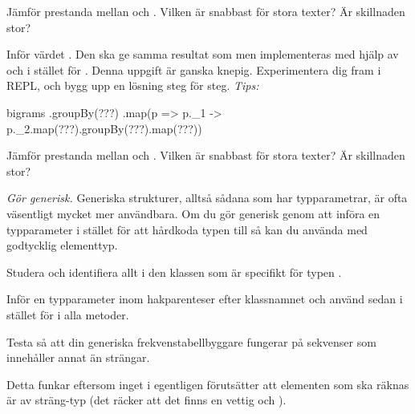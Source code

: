 \Subtask\Uberkurs Jämför prestanda mellan  och . Vilken är snabbast för stora texter? Är skillnaden stor?

\Subtask Inför värdet . Den ska ge samma resultat som  men implementeras med hjälp av  och  i stället för .
Denna uppgift är ganska knepig. Experimentera dig fram i REPL, och bygg upp en lösning steg för steg. \emph{Tips:}
\begin{Code}
bigrams
  .groupBy(???)
  .map(p => p._1 -> p._2.map(???).groupBy(???).map(???))
\end{Code}

\Subtask\Uberkurs Jämför prestanda mellan  och . Vilken är snabbast för stora texter? Är skillnaden stor?

\Task \emph{Gör  generisk.} Generiska strukturer, alltså sådana som har typparametrar, är ofta väsentligt mycket mer användbara. Om du gör  generisk genom att införa en typparameter i stället för att hårdkoda typen till  så kan du använda  med godtycklig elementtyp. 

\Subtask Studera  och identifiera allt i den klassen som är specifikt för typen .

\Subtask Inför en typparameter  inom hakparenteser efter klassnamnet och använd sedan  i stället för  i alla metoder.

\Subtask Testa så att din generiska frekvenstabellbyggare fungerar på sekvenser som innehåller annat än strängar.

Detta funkar eftersom inget i  egentligen förutsätter att elementen som ska räknas är av sträng-typ (det räcker att det finns en vettig  och ).
